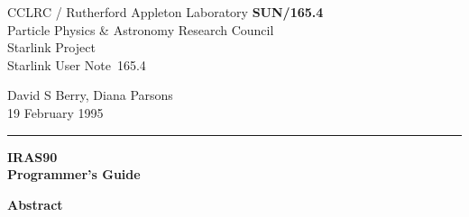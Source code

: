 \documentclass[twoside,11pt]{article}
\newcommand{\stardoccategory}  {Starlink User Note}
\newcommand{\stardocinitials}  {SUN}
\newcommand{\stardocnumber}    {165.4}
\newcommand{\stardocauthors}   {David S Berry, Diana Parsons}
\newcommand{\stardocdate}      {19 February 1995}
\newcommand{\stardoctitle}     {IRAS90\\[2ex]
                               Programmer's Guide}
\newcommand{\stardocname}{\stardocinitials /\stardocnumber}
\newenvironment{latexonly}{}{}
\begin{document}
\thispagestyle{empty}

\begin{latexonly}
   CCLRC / {\sc Rutherford Appleton Laboratory} \hfill {\bf \stardocname}\\
   {\large Particle Physics \& Astronomy Research Council}\\
   {\large Starlink Project\\}
   {\large \stardoccategory\ \stardocnumber}
   \begin{flushright}
   \stardocauthors\\
   \stardocdate
   \end{flushright}
   \vspace{-4mm}
   \rule{\textwidth}{0.5mm}
   \vspace{5mm}
   \begin{center}
   {\Huge\bf  \stardoctitle}
   \end{center}
   \vspace{5mm}

   \vspace{10mm}
   \begin{center}
      {\Large\bf Abstract}
   \end{center}
\end{latexonly}
\end{document}
